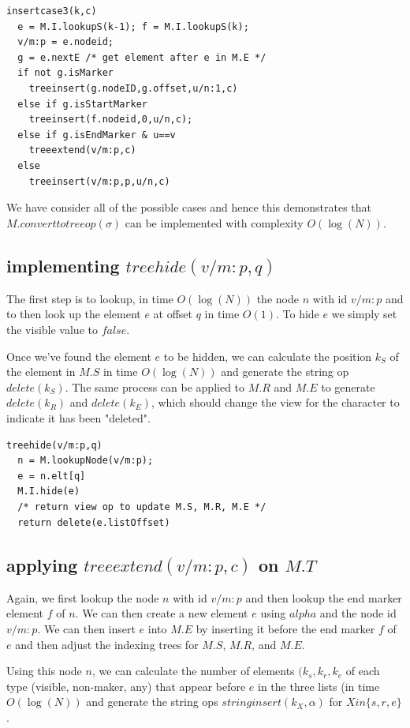 \documentclass{amsart}
\begin{document}
\begin{verbatim}
insertcase3(k,c)
  e = M.I.lookupS(k-1); f = M.I.lookupS(k);
  v/m:p = e.nodeid; 
  g = e.nextE /* get element after e in M.E */
  if not g.isMarker
    treeinsert(g.nodeID,g.offset,u/n:1,c)
  else if g.isStartMarker
    treeinsert(f.nodeid,0,u/n,c);
  else if g.isEndMarker & u==v
    treeextend(v/m:p,c)
  else
    treeinsert(v/m:p,p,u/n,c)
\end{verbatim}
We have consider all of the possible cases and hence this demonstrates that 
$M.converttotreeop(\sigma)$ can be implemented with complexity $O(\log(N))$.




\subsection{implementing $treehide(v/m:p,q)$}
The first step is to lookup, in time $O(\log(N))$ the node $n$ with id $v/m:p$
and to then look up the element $e$ at offset $q$ in time $O(1)$. 
To hide $e$ we simply set the visible value to $false$.

Once we've found the element $e$ to be hidden, we can
calculate the position $k_S$ of the element in $M.S$ in time $O(\log(N))$
and generate the string op $delete(k_S)$. The same process can be applied to
$M.R$ and $M.E$ to generate $delete(k_R)$ and $delete(k_E)$, which should
change the view for the character to indicate it has been "deleted".

\begin{verbatim}
treehide(v/m:p,q)
  n = M.lookupNode(v/m:p);
  e = n.elt[q]
  M.I.hide(e)
  /* return view op to update M.S, M.R, M.E */
  return delete(e.listOffset)
\end{verbatim}


\subsection{applying $treeextend(v/m:p,c)$ on $M.T$}
Again, we first lookup the node $n$ with id $v/m:p$ and then lookup the 
end marker element $f$ of $n$. We can then create a new element $e$
using $alpha$ and the node id $v/m:p$. We can then insert $e$ into
$M.E$ by inserting it before the end marker $f$ of $e$ and then adjust 
the indexing trees for $M.S$, $M.R$, and $M.E$.

Using this node $n$, we can calculate the number
of elements $(k_s,k_r,k_e$ of each type (visible, non-maker, any) that appear before $e$ in
the three lists (in time $O(\log(N))$ and generate the string ops $stringinsert(k_X,\alpha)$ for $X in \{s,r,e\}$.
\end{document}
